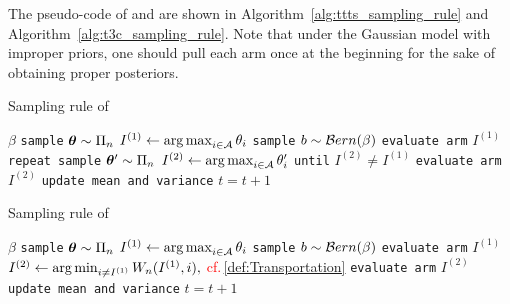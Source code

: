 The pseudo-code of \TTTS and \TCC are shown in Algorithm~\ref{alg:ttts_sampling_rule} and Algorithm~\ref{alg:t3c_sampling_rule}. Note that under the Gaussian model with improper priors, one should pull each arm once at the beginning for the sake of obtaining proper posteriors. 


\begin{algorithm}[ht]
\centering
\caption{Sampling rule of \TTTS}
\label{alg:ttts_sampling_rule}
\footnotesize
\begin{algorithmic}[1]
    $\beta$ %
        \State \texttt{sample} ${\boldsymbol \theta} \sim \Pi_n$
        \State $I^{(1)} \leftarrow \operatorname*{arg\,max}_{i\in\mathcal{A}}\theta_i$
	    \State \texttt{sample} $b \sim \mathcal{B} ern(\beta)$
	        \State \texttt{evaluate arm} $I^{(1)}$
	    \Else
	        \State \texttt{repeat sample} ${\boldsymbol \theta}' \sim \Pi_n$
            \State $I^{(2)} \leftarrow \operatorname*{arg\,max}_{i\in\mathcal{A}}\theta_i'$
	        \State \texttt{until} $I^{(2)} \neq I^{(1)}$
		    \State \texttt{evaluate arm} $I^{(2)}$
	    \EndIf
	    \State \texttt{update mean and variance}
	    \State $t = t+1$
   \EndFor
\end{algorithmic}
\end{algorithm}

\begin{algorithm}[ht]
\centering
\caption{Sampling rule of \textcolor{red}{\TCC}}
\label{alg:t3c_sampling_rule}
\footnotesize
\begin{algorithmic}[1]
    $\beta$ %
        \State \texttt{sample} ${\boldsymbol \theta} \sim \Pi_n$
        \State $I^{(1)} \leftarrow \operatorname*{arg\,max}_{i\in\mathcal{A}}\theta_i$
	    \State \texttt{sample} $b \sim \mathcal{B} ern(\beta)$
	        \State \texttt{evaluate arm} $I^{(1)}$
	    \Else
	        \State \textcolor{red}{$I^{(2)} \leftarrow \operatorname*{arg\,min}_{i\neq I^{(1)}}W_n(I^{(1)},i), $ cf.\,\eqref{def:Transportation}}
		    \State \texttt{evaluate arm} $I^{(2)}$
	    \EndIf
	    \State \texttt{update mean and variance}
	    \State $t = t+1$
   \EndFor
\end{algorithmic}
\end{algorithm}

